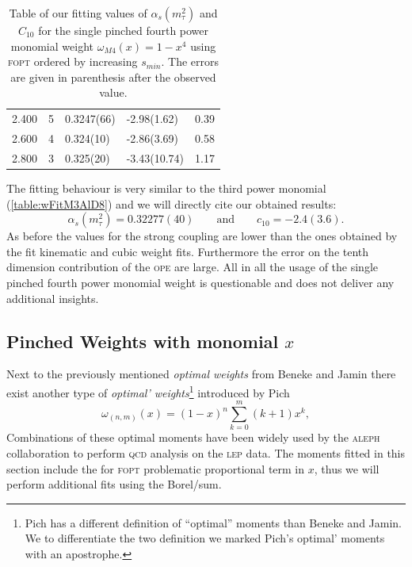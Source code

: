 \documentclass[../../index.tex]{subfiles}
\begin{document}
\begin{table}
\begin{tabularx}{\textwidth}{ccYYY}
    2.400 & 5  & 0.3247(66) & -2.98(1.62) & 0.39 \\
    2.600 & 4  & 0.324(10) & -2.86(3.69) & 0.58 \\
    2.800 & 3  & 0.325(20) & -3.43(10.74) & 1.17 \\
    \bottomrule
  \end{tabularx}
  \caption{Table of our fitting values of \(\alpha_s(m_\tau^2)\) and \(C_{10}\)
    for the single pinched fourth power monomial weight \(\omega_{M4}(x)=1-x^4\)
    using \textsc{fopt} ordered by increasing \(s_{min}\). The errors are given
    in parenthesis after the observed value.}
  \label{table:fitM4AlD10}
\end{table}
The fitting behaviour is very similar to the third power monomial
(\cref{table:wFitM3AlD8}) and we will directly cite our obtained results:
\begin{equation}
  \alpha_s(m_\tau^2) = 0.32277(40) \qquad \text{and} \qquad c_{10}=-2.4(3.6).
\end{equation}
As before the values for the strong coupling are lower than the ones obtained by
the fit kinematic and cubic weight fits. Furthermore the error on the tenth
dimension contribution of the \textsc{ope} are large. All in all the usage of
the single pinched fourth power monomial weight is questionable and does not
deliver any additional insights.


\subsection{Pinched Weights with monomial \(x\)}
Next to the previously mentioned \textit{optimal weights} from Beneke and Jamin
\cite{Beneke2012} there exist another type of \textit{optimal'
  weights}\footnote{Pich has a different definition of ``optimal'' moments than
  Beneke and Jamin. We to differentiate the two definition we marked Pich's
  optimal' moments with an apostrophe.} introduced by Pich \cite{LeDiberder1992}
\begin{equation}
  \omega_{(n,m)}(x) = (1-x)^n\sum_{k=0}^m (k+1)x^k,
\end{equation}
Combinations of these optimal moments have been widely used by the
\textsc{aleph} collaboration to perform \textsc{qcd} analysis on the
\textsc{lep} data. The moments fitted in this section include the for
\textsc{fopt} problematic proportional term in \(x\), thus we will perform
additional fits using the Borel\-/sum.
\end{document}
